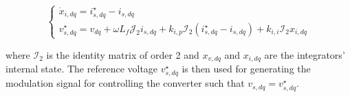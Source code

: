 \begin{equation}
    \begin{cases}
        \dot{x}_{i,dq} = i_{s,dq}^{\star} - i_{s,dq}\\
        v_{s,dq}^{\star} = v_{dq} + \omega L_f \mathcal{J}_2 i_{s,dq} + k_{i,p}\mathcal{I}_2 (i_{s,dq}^{\star} - i_{s,dq}) + k_{i,i}\mathcal{I}_2 x_{i,dq} 
    \end{cases}
    \label{eq:current_control}
\end{equation}

\noindent where $\mathcal{I}_2$ is the identity matrix of order 2 and $x_{v,dq}$
and $x_{i,dq}$ are the integrators' internal state. The reference voltage
$v_{s,dq}^{\star}$ is then used for generating the modulation signal for
controlling the converter such that $v_{s,dq} = v_{s,dq}^{\star}$.




